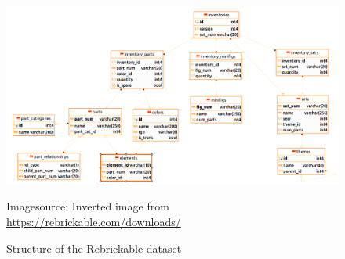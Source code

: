 \documentclass{article}
\theoremstyle{plain}
\theoremstyle{definition}
\theoremstyle{remark}
\newcommand*{\quelle}{
  \footnotesize Imagesource: Inverted image from\\
}
\begin{document}
\begin{figure}[ht]
 \vskip 0.2in
 \begin{center}
 \centerline{\includegraphics[width=\columnwidth]{../Images/inverted_database.png}}
 \quelle\url{https://rebrickable.com/downloads/}
\caption{Structure of the Rebrickable dataset}
\label{icml-historical}
 \end{center}
 \vskip 0.1in
\end{figure}
\end{document}
